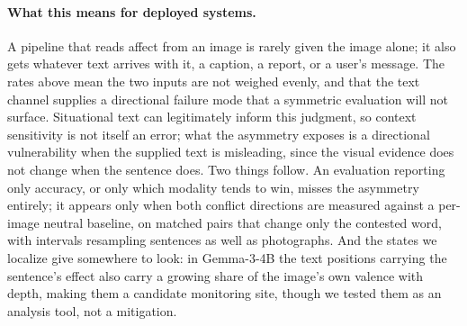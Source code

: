 \documentclass{article}
\newcommand{\gemma}{Gemma-3-4B}
\begin{document}
\paragraph{What this means for deployed systems.}
A pipeline that reads affect from an image is rarely given the image alone; it also gets whatever text arrives with it, a caption, a report, or a user's message. The rates above mean the two inputs are not weighed evenly, and that the text channel supplies a directional failure mode that a symmetric evaluation will not surface. Situational text can legitimately inform this judgment, so context sensitivity is not itself an error; what the asymmetry exposes is a directional vulnerability when the supplied text is misleading, since the visual evidence does not change when the sentence does. Two things follow. An evaluation reporting only accuracy, or only which modality tends to win, misses the asymmetry entirely; it appears only when both conflict directions are measured against a per-image neutral baseline, on matched pairs that change only the contested word, with intervals resampling sentences as well as photographs. And the states we localize give somewhere to look: in \gemma{} the text positions carrying the sentence's effect also carry a growing share of the image's own valence with depth, making them a candidate monitoring site, though we tested them as an analysis tool, not a mitigation.
\end{document}

